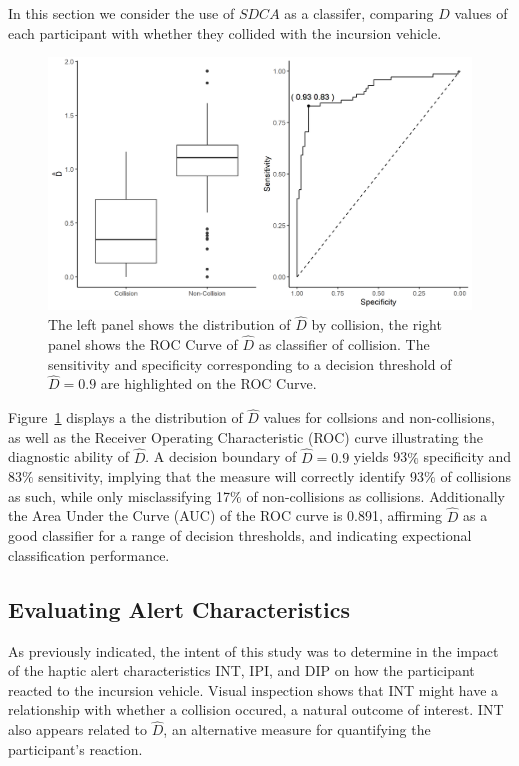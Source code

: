 \documentclass{article}
\begin{document}
In this section we consider the use of $SDCA$ as a classifer, comparing $\hat{D}$ values of each participant with whether they collided with the incursion vehicle.

\begin{figure}[h!]
\begin{center}
\includegraphics[width=.8\textwidth]{fig2.png}
\caption{The left panel shows the distribution of $\hat{D}$ by collision, the right panel shows the ROC Curve of $\hat{D} $ as classifier of collision.  The sensitivity and specificity corresponding to a decision threshold of $\hat{D} = 0.9$ are highlighted on the ROC Curve.}
\label{figure 2}
\end{center}
\end{figure}

Figure~\ref{figure 2} displays a the distribution of $\hat{D}$ values for collsions and non-collisions, as well as the Receiver Operating Characteristic (ROC) curve illustrating the diagnostic ability of $\hat{D}$.  A decision boundary of $\hat{D} = 0.9$ yields 93$\%$ specificity and 83$\%$ sensitivity, implying that the measure will correctly identify 93$\%$ of collisions as such, while only misclassifying 17$\%$ of non-collisions as collisions.  Additionally the Area Under the Curve (AUC) of the ROC curve is 0.891, affirming $\hat{D}$ as a good classifier for a range of decision thresholds, and indicating expectional classification performance.

\subsection{Evaluating Alert Characteristics}

As previously indicated, the intent of this study was to determine in the impact of the haptic alert characteristics INT, IPI, and DIP on how the participant reacted to the incursion vehicle. Visual inspection shows that INT might have a relationship with whether a collision occured, a natural outcome of interest. INT also appears related to $\hat{D}$, an alternative measure for quantifying the participant's reaction.
\end{document}
